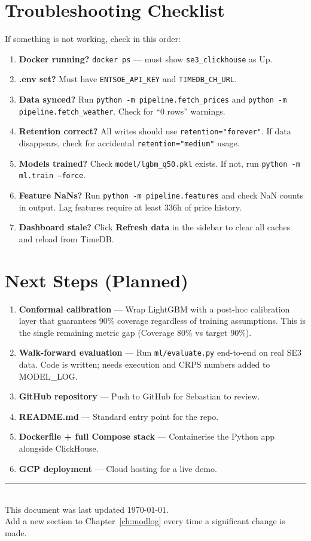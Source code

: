 \documentclass[12pt, a4paper, oneside]{memoir}
\newcommand{\code}[1]{\texttt{\footnotesize #1}}
\begin{document}
\section{Troubleshooting Checklist}

If something is not working, check in this order:

\begin{enumerate}
  \item \textbf{Docker running?} \code{docker ps} --- must show \code{se3\_clickhouse} as Up.
  \item \textbf{.env set?} Must have \code{ENTSOE\_API\_KEY} and \code{TIMEDB\_CH\_URL}.
  \item \textbf{Data synced?} Run \code{python -m pipeline.fetch\_prices} and
    \code{python -m pipeline.fetch\_weather}. Check for ``0 rows'' warnings.
  \item \textbf{Retention correct?} All writes should use \code{retention="forever"}.
    If data disappears, check for accidental \code{retention="medium"} usage.
  \item \textbf{Models trained?} Check \code{model/lgbm\_q50.pkl} exists. If not,
    run \code{python -m ml.train --force}.
  \item \textbf{Feature NaNs?} Run \code{python -m pipeline.features} and check
    NaN counts in output. Lag features require at least 336h of price history.
  \item \textbf{Dashboard stale?} Click \textbf{Refresh data} in the sidebar to
    clear all caches and reload from TimeDB.
\end{enumerate}

\section{Next Steps (Planned)}

\begin{enumerate}
  \item \textbf{Conformal calibration} --- Wrap LightGBM with a post-hoc calibration
    layer that guarantees 90\% coverage regardless of training assumptions. This is
    the single remaining metric gap (Coverage 80\% vs target 90\%).
  \item \textbf{Walk-forward evaluation} --- Run \code{ml/evaluate.py} end-to-end on
    real SE3 data. Code is written; needs execution and CRPS numbers added to MODEL\_LOG.
  \item \textbf{GitHub repository} --- Push to GitHub for Sebastian to review.
  \item \textbf{README.md} --- Standard entry point for the repo.
  \item \textbf{Dockerfile + full Compose stack} --- Containerise the Python app
    alongside ClickHouse.
  \item \textbf{GCP deployment} --- Cloud hosting for a live demo.
\end{enumerate}

\vfill
\begin{center}
{\color{se3gray}\rule{0.5\linewidth}{0.4pt}}\\[0.3cm]
{\sffamily\small\color{se3gray}
This document was last updated \today.\\
Add a new section to Chapter~\ref{ch:modlog} every time a significant change is made.
}
\end{center}
\end{document}
